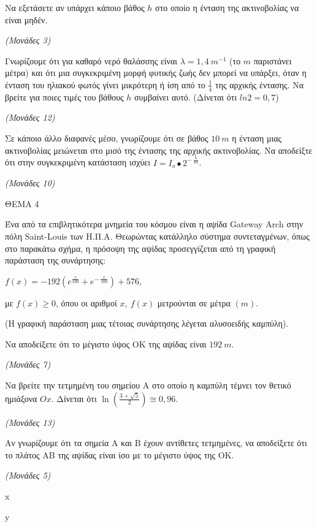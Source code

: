 \documentclass[11pt,a4paper,twoside]{book}
\newcommand{\monades}[1]{\hfill \textit{(Μονάδες #1)}}
\begin{document}
\begin{alist}
\item Να εξετάσετε αν υπάρχει κάποιο βάθος $h$ στο οποίο η ένταση της ακτινοβολίας να είναι μηδέν.

\monades{3}

\item Γνωρίζουμε ότι για καθαρό νερό θαλάσσης είναι $\lambda = 1,4\ m^{- 1}$ (το $m$ παριστάνει μέτρα) και ότι μια συγκεκριμένη μορφή φυτικής ζωής δεν μπορεί να υπάρξει, όταν η ένταση του ηλιακού φωτός γίνει μικρότερη ή ίση από το $\frac{1}{4}$ της αρχικής έντασης. Να βρείτε για ποιες τιμές του βάθους $h$ συμβαίνει αυτό. (Δίνεται ότι $ln2 = 0,7$)

\monades{12}

\item Σε κάποιο άλλο διαφανές μέσο, γνωρίζουμε ότι σε βάθος $10\ m$ η ένταση μιας ακτινοβολίας μειώνεται στο μισό της έντασης της αρχικής ακτινοβολίας. Να αποδείξτε ότι στην συγκεκριμένη κατάσταση ισχύει $I = I_{o} \bullet 2^{- \ \frac{h}{10}}$.

\monades{10}
\end{alist}

\vspace{4mm}

ΘΕΜΑ 4

Ένα από τα επιβλητικότερα μνημεία του κόσμου είναι η αψίδα Gateway Arch στην πόλη Saint-Louis των Η.Π.Α. Θεωρώντας κατάλληλο σύστημα συντεταγμένων, όπως στο παρακάτω σχήμα, η πρόσοψη της αψίδας προσεγγίζεται από τη γραφική παράσταση της συνάρτησης:

$f(x) = - 192\left( e^{\frac{x}{100}} + e^{- \ \frac{x}{100}} \right) + 576$,

με $f(x) \geq 0$, όπου οι αριθμοί $x,\ f(x)$ μετρούνται σε μέτρα $(m)$.

(Η γραφική παράσταση μιας τέτοιας συνάρτησης λέγεται αλυσοειδής καμπύλη).

\begin{alist}
\item Να αποδείξετε ότι το μέγιστο ύψος ΟΚ της αψίδας είναι $192\ m$.

\monades{7}

\item Να βρείτε την τετμημένη του σημείου Α στο οποίο η καμπύλη τέμνει τον θετικό ημιάξονα $Οx$. Δίνεται ότι $\ln\left( \frac{3 + \sqrt{5}}{2} \right) \cong 0,96$.

\monades{13}

\item Αν γνωρίζουμε ότι τα σημεία Α και Β έχουν αντίθετες τετμημένες, να αποδείξετε ότι το πλάτος ΑΒ της αψίδας είναι ίσο με το μέγιστο ύψος της ΟΚ.

\monades{5}

x

y
\end{alist}
\end{document}
